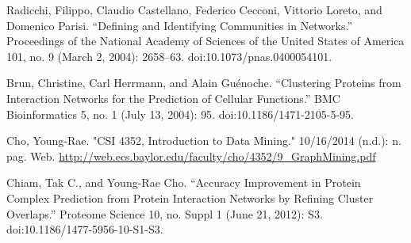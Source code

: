 \documentclass[journal]{IEEEtran}
\begin{document}

%
%
%
\begin{thebibliography}{1}
 
Radicchi, Filippo, Claudio Castellano, Federico Cecconi, Vittorio Loreto, and Domenico Parisi. “Defining and Identifying Communities in Networks.” Proceedings of the National Academy of Sciences of the United States of America 101, no. 9 (March 2, 2004): 2658–63. doi:10.1073/pnas.0400054101.

Brun, Christine, Carl Herrmann, and Alain Guénoche. “Clustering Proteins from Interaction Networks for the Prediction of Cellular Functions.” BMC Bioinformatics 5, no. 1 (July 13, 2004): 95. doi:10.1186/1471-2105-5-95.

 Cho, Young-Rae. "CSI 4352, Introduction to Data Mining." 10/16/2014 (n.d.): n. pag. Web. \url{http://web.ecs.baylor.edu/faculty/cho/4352/9_GraphMining.pdf}

 Chiam, Tak C., and Young-Rae Cho. “Accuracy Improvement in Protein Complex Prediction from Protein Interaction Networks by Refining Cluster Overlaps.” Proteome Science 10, no. Suppl 1 (June 21, 2012): S3. doi:10.1186/1477-5956-10-S1-S3.


\end{thebibliography}

% 
\end{document}
